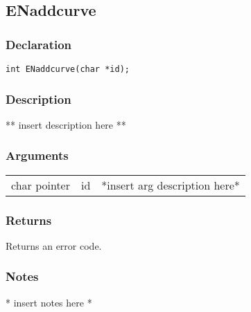 \subsection{ENaddcurve}
\subsubsection{Declaration}
\begin{lstlisting}
int ENaddcurve(char *id);
\end{lstlisting}
\subsubsection{Description}
** insert description here **
\subsubsection{Arguments}
\begin{tabular}{l r p{11cm} }
char pointer&id&*insert arg description here* \\[6pt]
\end{tabular}
\subsubsection{Returns}
Returns an error code.
\subsubsection{Notes}
* insert notes here *